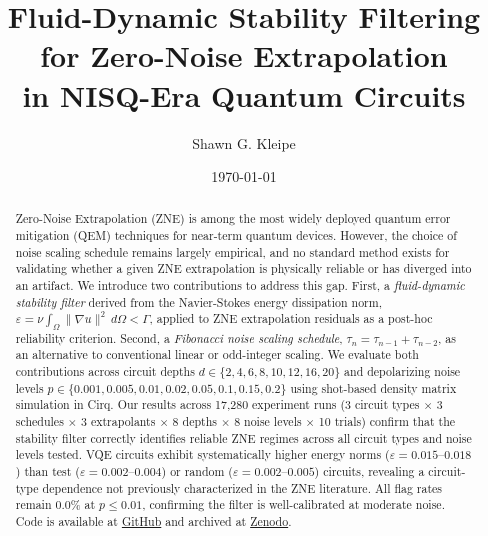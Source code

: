 \documentclass[twocolumn,showpacs,preprintnumbers,amsmath,amssymb,prl]{revtex4-2}
\newcommand{\AUTHORNAME}{Shawn G. Kleipe}
\newcommand{\GITHUBURL}{https://github.com/OfficialChaos/Quantum-Vortex-QEM}
\newcommand{\ZENODOID}{10.5281/zenodo.18849515}
\begin{document}
\title{Fluid-Dynamic Stability Filtering for Zero-Noise Extrapolation\\
in NISQ-Era Quantum Circuits}

\author{\AUTHORNAME}

\date{\today}

\begin{abstract}
Zero-Noise Extrapolation (ZNE) is among the most widely deployed quantum
error mitigation (QEM) techniques for near-term quantum devices. However,
the choice of noise scaling schedule remains largely empirical, and no
standard method exists for validating whether a given ZNE extrapolation
is physically reliable or has diverged into an artifact.
We introduce two contributions to address this gap.
First, a \emph{fluid-dynamic stability filter} derived from the
Navier-Stokes energy dissipation norm,
$\varepsilon = \nu \int_\Omega \|\nabla u\|^2 \, d\Omega < \Gamma$,
applied to ZNE extrapolation residuals as a post-hoc reliability criterion.
Second, a \emph{Fibonacci noise scaling schedule},
$\tau_n = \tau_{n-1} + \tau_{n-2}$,
as an alternative to conventional linear or odd-integer scaling.
We evaluate both contributions across circuit depths $d \in \{2,4,6,8,10,12,16,20\}$
and depolarizing noise levels $p \in \{0.001, 0.005, 0.01, 0.02, 0.05, 0.1, 0.15, 0.2\}$
using shot-based density matrix simulation in Cirq.
Our results across 17,280 experiment runs (3 circuit types $\times$ 3 schedules $\times$ 3 extrapolants $\times$ 8 depths $\times$ 8 noise levels $\times$ 10 trials) confirm that the stability filter correctly identifies reliable ZNE regimes across all circuit types and noise levels tested. VQE circuits exhibit systematically higher energy norms ($\varepsilon = 0.015$--$0.018$) than test ($\varepsilon = 0.002$--$0.004$) or random ($\varepsilon = 0.002$--$0.005$) circuits, revealing a circuit-type dependence not previously characterized in the ZNE literature. All flag rates remain 0.0\% at $p \leq 0.01$, confirming the filter is well-calibrated at moderate noise.
Code is available at \href{\GITHUBURL}{GitHub} and archived at
\href{https://doi.org/\ZENODOID}{Zenodo}.
\end{abstract}

\maketitle
\end{document}
